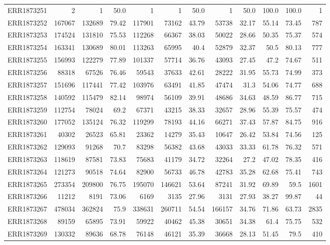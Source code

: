 \documentclass[12pt, oneside]{report}
\begin{document}
\begin{longtable}{@{}p{3.2cm}rrrrrrrrrrr@{}}
ERR1873251 & 2 & 1 & 50.0 & 1 & 1 & 50.0 & 1 & 50.0 & 100.0 & 100.0 & 1 \\
ERR1873252 & 167067 & 132689 & 79.42 & 117901 & 73162 & 43.79 & 53738 & 32.17 & 55.14 & 73.45 & 787 \\
ERR1873253 & 174524 & 131810 & 75.53 & 112268 & 66367 & 38.03 & 50022 & 28.66 & 50.35 & 75.37 & 574 \\
ERR1873254 & 163341 & 130689 & 80.01 & 113263 & 65995 & 40.4 & 52879 & 32.37 & 50.5 & 80.13 & 777 \\
ERR1873255 & 156993 & 122279 & 77.89 & 101337 & 57714 & 36.76 & 43093 & 27.45 & 47.2 & 74.67 & 511 \\
ERR1873256 & 88318 & 67526 & 76.46 & 59543 & 37633 & 42.61 & 28222 & 31.95 & 55.73 & 74.99 & 373 \\
ERR1873257 & 151696 & 117441 & 77.42 & 103976 & 63491 & 41.85 & 47474 & 31.3 & 54.06 & 74.77 & 688 \\
ERR1873258 & 140592 & 115479 & 82.14 & 98974 & 56109 & 39.91 & 48686 & 34.63 & 48.59 & 86.77 & 715 \\
ERR1873259 & 112754 & 78024 & 69.2 & 67371 & 43215 & 38.33 & 32657 & 28.96 & 55.39 & 75.57 & 474 \\
ERR1873260 & 177052 & 135124 & 76.32 & 119299 & 78193 & 44.16 & 66271 & 37.43 & 57.87 & 84.75 & 916 \\
ERR1873261 & 40302 & 26523 & 65.81 & 23362 & 14279 & 35.43 & 10647 & 26.42 & 53.84 & 74.56 & 125 \\
ERR1873262 & 129093 & 91268 & 70.7 & 83298 & 56382 & 43.68 & 43033 & 33.33 & 61.78 & 76.32 & 571 \\
ERR1873263 & 118619 & 87581 & 73.83 & 75683 & 41179 & 34.72 & 32264 & 27.2 & 47.02 & 78.35 & 416 \\
ERR1873264 & 121273 & 90518 & 74.64 & 82900 & 56733 & 46.78 & 42783 & 35.28 & 62.68 & 75.41 & 743 \\
ERR1873265 & 273354 & 209800 & 76.75 & 195070 & 146621 & 53.64 & 87241 & 31.92 & 69.89 & 59.5 & 1601 \\
ERR1873266 & 11212 & 8191 & 73.06 & 6169 & 3135 & 27.96 & 3131 & 27.93 & 38.27 & 99.87 & 44 \\
ERR1873267 & 478034 & 362824 & 75.9 & 338631 & 260711 & 54.54 & 166157 & 34.76 & 71.86 & 63.73 & 2835 \\
ERR1873268 & 89159 & 65895 & 73.91 & 59922 & 40462 & 45.38 & 30651 & 34.38 & 61.4 & 75.75 & 532 \\
ERR1873269 & 130332 & 89636 & 68.78 & 76148 & 46121 & 35.39 & 36668 & 28.13 & 51.45 & 79.5 & 410 \\

\end{longtable}
\end{document}

